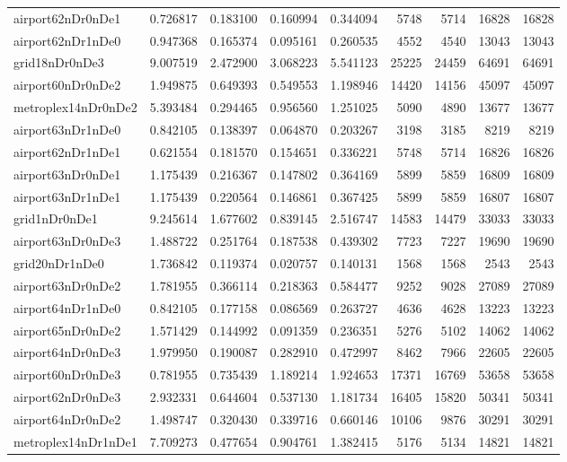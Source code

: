 \begin{longtable}{|l|r|r|r|r|r|r|r|r|}
airport62nDr0nDe1 & 0.726817 & 0.183100 & 0.160994 & 0.344094 & 5748 & 5714 & 16828 & 16828 \\
airport62nDr1nDe0 & 0.947368 & 0.165374 & 0.095161 & 0.260535 & 4552 & 4540 & 13043 & 13043 \\
grid18nDr0nDe3 & 9.007519 & 2.472900 & 3.068223 & 5.541123 & 25225 & 24459 & 64691 & 64691 \\
airport60nDr0nDe2 & 1.949875 & 0.649393 & 0.549553 & 1.198946 & 14420 & 14156 & 45097 & 45097 \\
metroplex14nDr0nDe2 & 5.393484 & 0.294465 & 0.956560 & 1.251025 & 5090 & 4890 & 13677 & 13677 \\
airport63nDr1nDe0 & 0.842105 & 0.138397 & 0.064870 & 0.203267 & 3198 & 3185 & 8219 & 8219 \\
airport62nDr1nDe1 & 0.621554 & 0.181570 & 0.154651 & 0.336221 & 5748 & 5714 & 16826 & 16826 \\
airport63nDr0nDe1 & 1.175439 & 0.216367 & 0.147802 & 0.364169 & 5899 & 5859 & 16809 & 16809 \\
airport63nDr1nDe1 & 1.175439 & 0.220564 & 0.146861 & 0.367425 & 5899 & 5859 & 16807 & 16807 \\
grid1nDr0nDe1 & 9.245614 & 1.677602 & 0.839145 & 2.516747 & 14583 & 14479 & 33033 & 33033 \\
airport63nDr0nDe3 & 1.488722 & 0.251764 & 0.187538 & 0.439302 & 7723 & 7227 & 19690 & 19690 \\
grid20nDr1nDe0 & 1.736842 & 0.119374 & 0.020757 & 0.140131 & 1568 & 1568 & 2543 & 2543 \\
airport63nDr0nDe2 & 1.781955 & 0.366114 & 0.218363 & 0.584477 & 9252 & 9028 & 27089 & 27089 \\
airport64nDr1nDe0 & 0.842105 & 0.177158 & 0.086569 & 0.263727 & 4636 & 4628 & 13223 & 13223 \\
airport65nDr0nDe2 & 1.571429 & 0.144992 & 0.091359 & 0.236351 & 5276 & 5102 & 14062 & 14062 \\
airport64nDr0nDe3 & 1.979950 & 0.190087 & 0.282910 & 0.472997 & 8462 & 7966 & 22605 & 22605 \\
airport60nDr0nDe3 & 0.781955 & 0.735439 & 1.189214 & 1.924653 & 17371 & 16769 & 53658 & 53658 \\
airport62nDr0nDe3 & 2.932331 & 0.644604 & 0.537130 & 1.181734 & 16405 & 15820 & 50341 & 50341 \\
airport64nDr0nDe2 & 1.498747 & 0.320430 & 0.339716 & 0.660146 & 10106 & 9876 & 30291 & 30291 \\
metroplex14nDr1nDe1 & 7.709273 & 0.477654 & 0.904761 & 1.382415 & 5176 & 5134 & 14821 & 14821 \\

\end{longtable}
